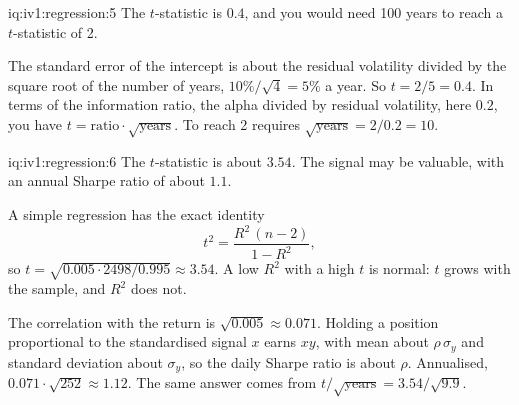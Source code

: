 \begin{solution}{iq:iv1:regression:5}
The $t$-statistic is $0.4$, and you would need 100 years to reach a $t$-statistic of 2.

The standard error of the intercept is about the residual volatility divided by the square root of the number of years, $10\%/\sqrt4 = 5\%$ a year. So $t = 2/5 = 0.4$. In terms of the information ratio, the alpha divided by residual volatility, here $0.2$, you have $t = \text{ratio} \cdot \sqrt{\text{years}}$. To reach 2 requires $\sqrt{\text{years}} = 2/0.2 = 10$.

\end{solution}

\enlargethispage{-6\baselineskip}%
\begin{solution}{iq:iv1:regression:6}
The $t$-statistic is about $3.54$. The signal may be valuable, with an annual Sharpe ratio of about $1.1$.

A simple regression has the exact identity
\[
t^2 = \frac{R^2\,(n - 2)}{1 - R^2},
\]
so $t = \sqrt{0.005 \cdot 2498/0.995} \approx 3.54$. A low $R^2$ with a high $t$ is normal: $t$ grows with the sample, and $R^2$ does not.

The correlation with the return is $\sqrt{0.005} \approx 0.071$. Holding a position proportional to the standardised signal $x$ earns $xy$, with mean about $\rho\,\sigma_y$ and standard deviation about $\sigma_y$, so the daily Sharpe ratio is about $\rho$. Annualised, $0.071 \cdot \sqrt{252} \approx 1.12$. The same answer comes from $t/\sqrt{\text{years}} = 3.54/\sqrt{9.9}$.

\end{solution}

